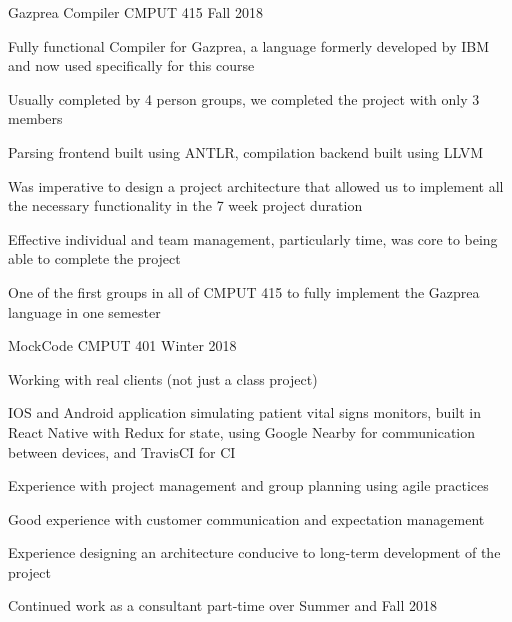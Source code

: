\begin{cventries}
  \cventry
    {} %
    {Gazprea Compiler} %
    {CMPUT 415} %
    {Fall 2018} %
    {
      \begin{cvitems}
      \item {Fully functional Compiler for Gazprea, a language formerly developed by IBM and now used specifically for this course}
      \item {Usually completed by 4 person groups, we completed the project with only 3 members}
      \item {Parsing frontend built using ANTLR, compilation backend built using LLVM}
      \item {Was imperative to design a project architecture that allowed us to implement all the necessary functionality in the 7 week project duration}
      \item {Effective individual and team management, particularly time, was core to being able to complete the project}
      \item {One of the first groups in all of CMPUT 415 to fully implement the Gazprea language in one semester}
      \end{cvitems}
    }

  \cventry
    {}
    {MockCode}
    {CMPUT 401}
    {Winter 2018}
    {
      \begin{cvitems}
      \item {Working with real clients (not just a class project)}
      \item {IOS and Android application simulating patient vital signs monitors, built in React Native 
        with Redux for state, using Google Nearby for communication between devices, and TravisCI for CI}
      \item {Experience with project management and group planning using agile practices}
      \item {Good experience with customer communication and expectation management}
      \item {Experience designing an architecture conducive to long-term development of the project}
      \item {Continued work as a consultant part-time over Summer and Fall 2018}
      \end{cvitems}
    }


\end{cventries}
